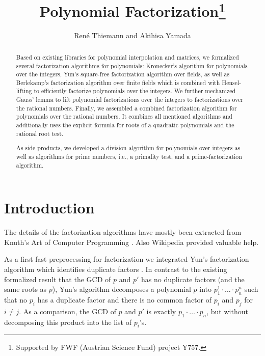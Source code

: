 \documentclass[11pt,a4paper]{article}
\begin{document}
\title{Polynomial Factorization\footnote{Supported by FWF (Austrian Science Fund) project Y757.}}
\author{Ren\'e Thiemann and Akihisa Yamada}
\maketitle

\begin{abstract}
Based on existing libraries for polynomial interpolation and matrices,
we formalized several factorization algorithms for polynomials: 
Kronecker's algorithm for polynomials over the integers, Yun's square-free factorization algorithm over fields, as well as Berlekamp's
factorization algorithm over finite fields which is combined with Hensel-lifting to 
efficiently factorize polynomials over the integers. 
We further mechanized Gauss' lemma to lift polynomial factorizations over the integers to
factorizations over the rational numbers.
Finally, we assembled a combined factorization algorithm for polynomials over the rational numbers.
It combines all mentioned algorithms and additionally uses the explicit formula for roots 
of a quadratic polynomials and the rational root test.

As side products, we developed a division algorithm for polynomials over integers as
well as algorithms for prime numbers, i.e., a primality test,
and a prime-factorization algorithm.
\end{abstract}

\tableofcontents

\section{Introduction}

The details of the factorization algorithms have mostly been extracted 
from Knuth's Art of Computer Programming
\cite{Knuth}. Also Wikipedia provided valuable help.

\medskip
As a first fast
preprocessing for factorization we integrated Yun's factorization algorithm which identifies duplicate
factors \cite{Yun}. In contrast to the existing formalized result that the GCD of $p$ and $p'$ has no
duplicate factors (and the same roots as $p$), Yun's algorithm decomposes a polynomial $p$ into
$p_1^1 \cdot \ldots \cdot p_n^n$ such that no $p_i$ has a duplicate factor and there is no common
factor of $p_i$ and $p_j$ for $i \neq j$. As a comparison, the GCD of $p$ and $p'$ is exactly
$p_1 \cdot \ldots \cdot p_n$, but without decomposing this product into the list of $p_i$'s.
\end{document}
